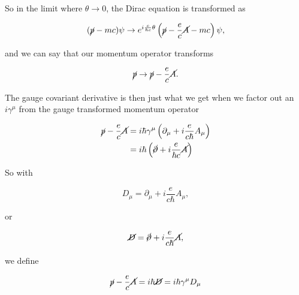 So in the limit where $\theta \rightarrow 0$, the Dirac equation is transformed as

\begin{equation}\label{eqn:diracCovariant:535}
(\cancel{p} - m c) \psi
\rightarrow
e^{i \frac{e}{\hbar c} \theta } 
\left(
\cancel{p} - \frac{e}{c} \cancel{A} - m c
\right) \psi,
\end{equation}

and we can say that our momentum operator transforms

\begin{equation}\label{eqn:diracCovariant:540}
\cancel{p} \rightarrow \cancel{p} - \frac{e}{c} \cancel{A}.
\end{equation}

The gauge covariant derivative is then just what we get when we factor out an $i\gamma^\mu$ from the gauge transformed momentum operator

\begin{align*}
\cancel{p} - \frac{e}{c} \cancel{A} 
&= i \hbar \gamma^\mu \left( 
\partial_\mu + i \frac{e}{ c \hbar } A_\mu \right) \\
&=
i \hbar \left( \cancel{\partial} + i \frac{ e }{ \hbar c} \cancel{A} \right)
\end{align*}

So with

\begin{equation}\label{eqn:diracCovariant:550}
D_\mu = 
\partial_\mu + i \frac{e}{ c \hbar } A_\mu,
\end{equation}

or

\begin{equation}\label{eqn:diracCovariant:560}
\cancel{D} =
\cancel{\partial} + i \frac{e}{ c \hbar } \cancel{A},
\end{equation}

we define

\begin{equation}\label{eqn:diracCovariant:570}
\cancel{p} - \frac{e}{c} \cancel{A} = i \hbar \cancel{D} = i \hbar \gamma^\mu D_\mu
\end{equation}

\EndArticle
